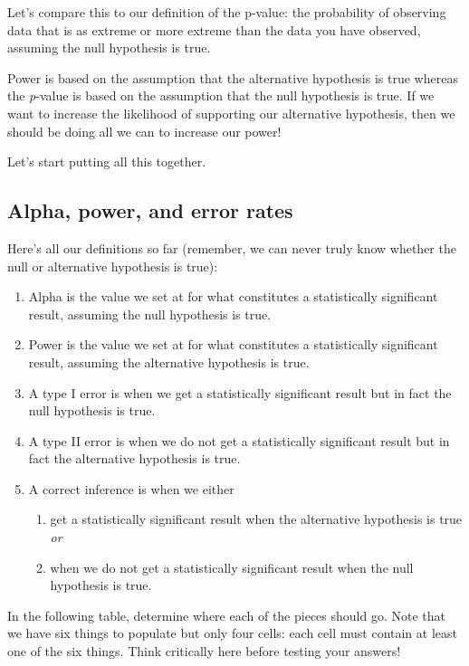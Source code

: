 \documentclass[
]{book}
\begin{document}
Let's compare this to our definition of the p-value: the probability of observing data that is as extreme or more extreme than the data you have observed, assuming the null hypothesis is true.

Power is based on the assumption that the alternative hypothesis is true whereas the \emph{p}-value is based on the assumption that the null hypothesis is true. If we want to increase the likelihood of supporting our alternative hypothesis, then we should be doing all we can to increase our power!

Let's start putting all this together.

\hypertarget{alpha-power-and-error-rates}{%
\subsection{Alpha, power, and error rates}\label{alpha-power-and-error-rates}}

Here's all our definitions so far (remember, we can never truly know whether the null or alternative hypothesis is true):

\begin{enumerate}
\def\labelenumi{\arabic{enumi}.}
\item
  Alpha is the value we set at for what constitutes a statistically significant result, assuming the null hypothesis is true.
\item
  Power is the value we set at for what constitutes a statistically significant result, assuming the alternative hypothesis is true.
\item
  A type I error is when we get a statistically significant result but in fact the null hypothesis is true.
\item
  A type II error is when we do not get a statistically significant result but in fact the alternative hypothesis is true.
\item
  A correct inference is when we either

  \begin{enumerate}
  \def\labelenumii{\arabic{enumii}.}
  \item
    get a statistically significant result when the alternative hypothesis is true \emph{or}
  \item
    when we do not get a statistically significant result when the null hypothesis is true.
  \end{enumerate}
\end{enumerate}

In the following table, determine where each of the pieces should go. Note that we have six things to populate but only four cells: each cell must contain at least one of the six things. Think critically here before testing your answers!
\end{document}
